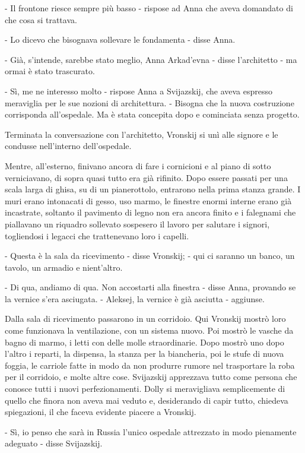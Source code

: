 - Il frontone riesce sempre più basso - rispose ad Anna che aveva domandato di che cosa si trattava. 

- Lo dicevo che bisognava sollevare le fondamenta - disse Anna. 

- Già, s'intende, sarebbe stato meglio, Anna Arkad'evna - disse l'architetto - ma ormai è stato trascurato. 

- Sì, me ne interesso molto - rispose Anna a Svijazskij, che aveva espresso meraviglia per le sue nozioni di architettura. - Bisogna che la nuova costruzione corrisponda all'ospedale. Ma è stata concepita dopo e cominciata senza progetto. 

Terminata la conversazione con l'architetto, Vronskij si unì alle signore e le condusse nell'interno dell'ospedale. 

Mentre, all'esterno, finivano ancora di fare i cornicioni e al piano di sotto verniciavano, di sopra quasi tutto era già rifinito. Dopo essere passati per una scala larga di ghisa, su di un pianerottolo, entrarono nella prima stanza grande. I muri erano intonacati di gesso, uso marmo, le finestre enormi interne erano già incastrate, soltanto il pavimento di legno non era ancora finito e i falegnami che piallavano un riquadro sollevato sospesero il lavoro per salutare i signori, togliendosi i legacci che trattenevano loro i capelli. 

- Questa è la sala da ricevimento - disse Vronskij; - qui ci saranno un banco, un tavolo, un armadio e nient'altro. 

- Di qua, andiamo di qua. Non accostarti alla finestra - disse Anna, provando se la vernice s'era asciugata. - Aleksej, la vernice è già asciutta - aggiunse. 

Dalla sala di ricevimento passarono in un corridoio. Qui Vronskij mostrò loro come funzionava la ventilazione, con un sistema nuovo. Poi mostrò le vasche da bagno di marmo, i letti con delle molle straordinarie. Dopo mostrò uno dopo l'altro i reparti, la dispensa, la stanza per la biancheria, poi le stufe di nuova foggia, le carriole fatte in modo da non produrre rumore nel trasportare la roba per il corridoio, e molte altre cose. Svijazskij apprezzava tutto come persona che conosce tutti i nuovi perfezionamenti. Dolly si meravigliava semplicemente di quello che finora non aveva mai veduto e, desiderando di capir tutto, chiedeva spiegazioni, il che faceva evidente piacere a Vronskij. 

- Sì, io penso che sarà in Russia l'unico ospedale attrezzato in modo pienamente adeguato - disse Svijazskij. 

